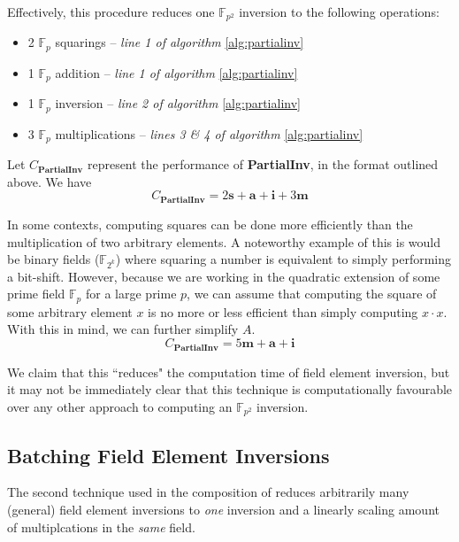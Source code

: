 Effectively, this procedure reduces one $\mathbb{F}_{p^{2}}$ inversion to the following operations: 

\begin{center}
\begin{itemize}
\item 2 $\mathbb{F}_{p}$ squarings -- \emph{line 1 of algorithm} \ref{alg:partialinv}
\item 1 $\mathbb{F}_{p}$ addition -- \emph{line 1 of algorithm} \ref{alg:partialinv}
\item 1 $\mathbb{F}_{p}$ inversion -- \emph{line 2 of algorithm} \ref{alg:partialinv}
\item 3 $\mathbb{F}_{p}$ multiplications -- \emph{lines 3 \& 4 of algorithm} \ref{alg:partialinv}
\end{itemize}
\end{center}

Let $C_{\textbf{PartialInv}}$ represent the performance of \textbf{PartialInv}, in the format outlined above. We have
$$
C_{\textbf{PartialInv}} = 2\textbf{s} + \textbf{a} + \textbf{i} + 3\textbf{m}
$$

In some contexts, computing squares can be done more efficiently than the multiplication of two arbitrary elements. A noteworthy example of this is would be binary fields ($\mathbb{F}_{2^k}$) where squaring a number is equivalent to simply performing a bit-shift. However, because we are working in the quadratic extension of some prime field $\mathbb{F}_p$ for a large prime $p$, we can assume that computing the square of some arbitrary element $x$ is no more or less efficient than simply computing $x \cdot x$. With this in mind, we can further simplify $A$.
$$
C_{\textbf{PartialInv}} = 5\textbf{m} + \textbf{a} + \textbf{i}
$$

We claim that this ``reduces" the computation time of field element inversion, but it may not be immediately clear that this technique is computationally favourable over any other approach to computing an $\mathbb{F}_{p^{2}}$ inversion. 

\subsection{Batching Field Element Inversions}

The second technique used in the composition of  reduces arbitrarily many (general) field element inversions to \emph{one} inversion and a linearly scaling amount of multiplcations in the \emph{same} field.

